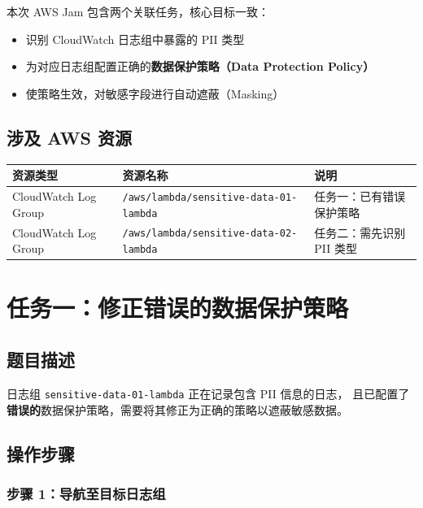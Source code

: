 \documentclass[12pt, a4paper]{article}
\begin{document}
本次 AWS Jam 包含两个关联任务，核心目标一致：

\begin{itemize}[leftmargin=2em]
  \item 识别 CloudWatch 日志组中暴露的 PII 类型
  \item 为对应日志组配置正确的\textbf{数据保护策略（Data Protection Policy）}
  \item 使策略生效，对敏感字段进行自动遮蔽（Masking）
\end{itemize}

\subsection{涉及 AWS 资源}

\begin{center}
\begin{tabular}{@{}lll@{}}
\toprule
\textbf{资源类型} & \textbf{资源名称} & \textbf{说明} \\
\midrule
CloudWatch Log Group & \texttt{/aws/lambda/sensitive-data-01-lambda} & 任务一：已有错误保护策略 \\
CloudWatch Log Group & \texttt{/aws/lambda/sensitive-data-02-lambda} & 任务二：需先识别 PII 类型 \\
\bottomrule
\end{tabular}
\end{center}

\newpage

\section{任务一：修正错误的数据保护策略}

\subsection{题目描述}

日志组 \texttt{sensitive-data-01-lambda} 正在记录包含 PII 信息的日志，
且已配置了\textbf{错误的}数据保护策略，需要将其修正为正确的策略以遮蔽敏感数据。

\subsection{操作步骤}

\subsubsection{步骤 1：导航至目标日志组}
\end{document}
